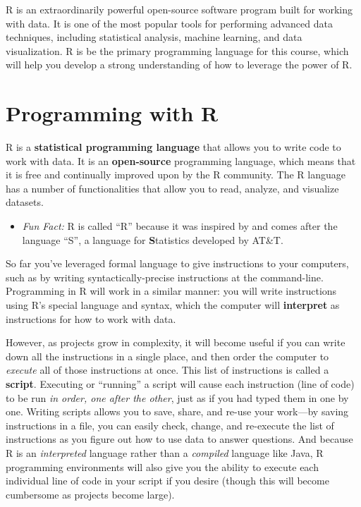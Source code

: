 \documentclass[]{book}
\providecommand{\tightlist}{%
  \setlength{\itemsep}{0pt}\setlength{\parskip}{0pt}}
\theoremstyle{definition}
\theoremstyle{definition}
\theoremstyle{remark}
\begin{document}
R is an extraordinarily powerful open-source software program built for
working with data. It is one of the most popular tools for performing
advanced data techniques, including statistical analysis, machine
learning, and data visualization. R is be the primary programming
language for this course, which will help you develop a strong
understanding of how to leverage the power of R.

\section{Programming with R}\label{programming-with-r}

R is a \textbf{statistical programming language} that allows you to
write code to work with data. It is an \textbf{open-source} programming
language, which means that it is free and continually improved upon by
the R community. The R language has a number of functionalities that
allow you to read, analyze, and visualize datasets.

\begin{itemize}
\tightlist
\item
  \emph{Fun Fact:} R is called ``R'' because it was inspired by and
  comes after the language ``S'', a language for \textbf{S}tatistics
  developed by AT\&T.
\end{itemize}

So far you've leveraged formal language to give instructions to your
computers, such as by writing syntactically-precise instructions at the
command-line. Programming in R will work in a similar manner: you will
write instructions using R's special language and syntax, which the
computer will \textbf{interpret} as instructions for how to work with
data.

However, as projects grow in complexity, it will become useful if you
can write down all the instructions in a single place, and then order
the computer to \emph{execute} all of those instructions at once. This
list of instructions is called a \textbf{script}. Executing or
``running'' a script will cause each instruction (line of code) to be
run \emph{in order, one after the other}, just as if you had typed them
in one by one. Writing scripts allows you to save, share, and re-use
your work---by saving instructions in a file, you can easily check,
change, and re-execute the list of instructions as you figure out how to
use data to answer questions. And because R is an \emph{interpreted}
language rather than a \emph{compiled} language like Java, R programming
environments will also give you the ability to execute each individual
line of code in your script if you desire (though this will become
cumbersome as projects become large).
\end{document}
